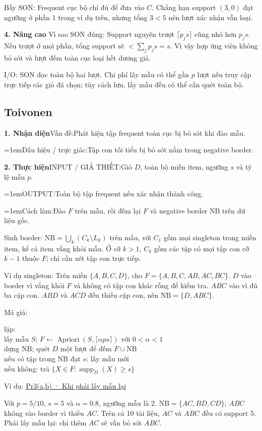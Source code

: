 \documentclass[10pt,a4paper,twocolumn]{article}
\makeatletter
\newif\ifexamheadingprinted
\newcommand{\topic}[2]{%
  \global\examheadingprintedfalse\par\subsection{#2}\label{topic:#1}}
\newcommand{\key}[1]{#1:\enspace}
\newcommand{\blocklabel}[1]{\par\noindent#1\par\nobreak}
\newcommand{\qlink}[2]{\hyperref[question:#1]{#2}}
\newenvironment{example}[2]{%
  \par\addvspace{6pt}\noindent
  \raggedright
  \blocklabel{Ví dụ: \qlink{#1}{#2}}%
}{\par\addvspace{4pt}}
\newcommand{\algfield}[2]{\par\noindent\hangindent=1em\relax#1:\enspace#2}
\newcommand{\unitheading}[2]{%
  \par\addvspace{1pt}\noindent\textbf{#1. #2}\enspace}
\newcommand{\unitadvanced}{\unitheading{4}{Nâng cao}}
\newcommand{\unitfield}[4]{%
  \par\noindent\textbf{#1. #2}\enspace #3:\enspace #4}
\newcommand{\algsummary}[6]{%
  \begingroup\setlength{\parskip}{1pt}%
  \unitfield{1}{Nhận diện}{Vấn đề}{#1}%
  \algfield{Dấu hiệu / trực giác}{#2}%
  \if\relax\detokenize{#3}\relax\else\par\noindent#3\par\fi%
  \unitfield{2}{Thực hiện}{INPUT / GIẢ THIẾT}{#4}%
  \algfield{OUTPUT}{#5}%
  \algfield{Cách làm}{#6}\par\endgroup}
\newenvironment{algpseudo}{%
  \par\addvspace{2pt}\noindent
  \setlength{\parskip}{0pt}%
  Mã giả:\par\nobreak
  \begin{list}{}{\setlength{\leftmargin}{1em}\setlength{\topsep}{0pt}%
    \setlength{\partopsep}{0pt}\setlength{\parsep}{0pt}%
    \@beginparpenalty=10000\relax}%
  \item\relax
}{\end{list}\par\addvspace{3pt}}
\makeatother
\begin{document}
\key{Bẫy SON} Frequent cục bộ chỉ đủ để đưa vào $C$. Chẳng hạn support $(3,0)$ đạt ngưỡng ở phần 1 trong ví dụ trên, nhưng tổng $3<5$ nên lượt xác nhận vẫn loại.

\unitadvanced
\key{Vì sao SON đúng} Support nguyên trượt $\lceil p_js\rceil$ cũng nhỏ hơn $p_js$. Nếu trượt ở mọi phần, tổng support sẽ $<\sum_j p_js=s$. Vì vậy hợp ứng viên không bỏ sót và lượt đếm toàn cục loại hết dương giả.

\key{I/O} SON đọc toàn bộ hai lượt. Chi phí lấy mẫu có thể gần $p$ lượt nếu truy cập trực tiếp các giỏ đã chọn; tùy cách lưu, lấy mẫu đều có thể cần quét toàn bộ.
\topic{toivonen}{Toivonen}

\algsummary{Phát hiện tập frequent toàn cục bị bỏ sót khi đào mẫu.}{Tập con tối tiểu bị bỏ sót nằm trong negative border.}{}{Giỏ $D$, toàn bộ miền item, ngưỡng $s$ và tỷ lệ mẫu $p$.}{Toàn bộ tập frequent nếu xác nhận thành công.}{Đào $F$ trên mẫu, rồi đếm lại $F$ và negative border $\mathrm{NB}$ trên dữ liệu gốc.}

\key{Sinh border} $\mathrm{NB}=\bigcup_k(C_k\setminus L_k)$ trên mẫu, với $C_1$ gồm mọi singleton trong miền item, kể cả item vắng khỏi mẫu. Ở cỡ $k>1$, $C_k$ gồm các tập có mọi tập con cỡ $k-1$ thuộc $F$; chỉ cần xét tập con trực tiếp.

\key{Ví dụ singleton} Trên miền $\{A,B,C,D\}$, cho $F=\{A,B,C,AB,AC,BC\}$. $D$ vào border vì vắng khỏi $F$ và không có tập con khác rỗng để kiểm tra. $ABC$ vào vì đủ ba cặp con. $ABD$ và $ACD$ đều thiếu cặp con, nên $\mathrm{NB}=\{D,ABC\}$.

\begin{algpseudo}
lặp:\\
\quad lấy mẫu $S$; $F\gets\operatorname{Apriori}(S,\lceil\alpha ps\rceil)$ với $0<\alpha<1$\\
\quad dựng $\mathrm{NB}$; quét $D$ một lượt để đếm $F\cup\mathrm{NB}$\\
\quad nếu có tập trong $\mathrm{NB}$ đạt $s$: lấy mẫu mới\\
\quad nếu không: trả $\{X\in F:\operatorname{supp}_D(X)\ge s\}$
\end{algpseudo}

\begin{example}{Pr3}{Pr3(a,b) · Khi phải lấy mẫu lại}
Với $p=5/10$, $s=5$ và $\alpha=0.8$, ngưỡng mẫu là 2. $\mathrm{NB}=\{AC,BD,CD\}$; $ABC$ không vào border vì thiếu $AC$. Trên cả 10 tài liệu, $AC$ và $ABC$ đều có support 5. Phải lấy mẫu lại: chỉ thêm $AC$ sẽ vẫn bỏ sót $ABC$.
\end{example}
\end{document}
